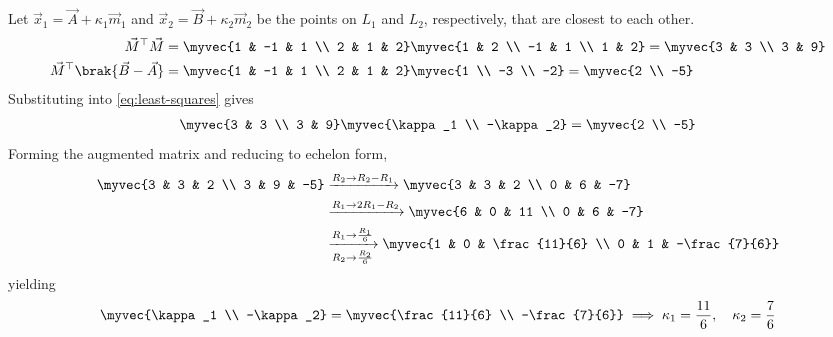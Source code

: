 \begin{enumerate}[label=\thesubsection.\arabic*, ref=\thesubsection.\theenumi]
Let $\vec{x}_1 = \vec{A} + \kappa_1 \vec{m}_1$ and $\vec{x}_2 = \vec{B} + \kappa_2 \vec{m}_2$ be the points on $L_1$ and $L_2$, respectively, that are closest to each other.\\
\begin{align}
	\vec{M}^{\top}\vec{M} &= \myvec{1 & -1 & 1 \\ 2 & 1 & 2}\myvec{1 & 2 \\ -1 & 1 \\ 1 & 2} = \myvec{3 & 3 \\ 3 & 9} \\
	\vec{M}^{\top}\brak{\vec{B} - \vec{A}} &= \myvec{1 & -1 & 1 \\ 2 & 1 & 2}\myvec{1 \\ -3 \\ -2} = \myvec{2 \\ -5}
\end{align}
Substituting into \eqref{eq:least-squares} gives
\begin{align}
	\myvec{3 & 3 \\ 3 & 9}\myvec{\kappa_1 \\ -\kappa_2} = \myvec{2 \\ -5}
\end{align}
Forming the augmented matrix and reducing to echelon form,
\begin{align}
	\myvec{3 & 3 & 2 \\ 3 & 9 & -5}
	&\xrightarrow{R_2 \to R_2 - R_1}
	\myvec{3 & 3 & 2 \\ 0 & 6 & -7} \\
	&\xrightarrow{R_1 \to 2R_1 - R_2}
	\myvec{6 & 0 & 11 \\ 0 & 6 & -7} \\
	&\xrightarrow[R_2 \to \frac{R_2}{6}]{R_1 \to \frac{R_1}{6}}
	\myvec{1 & 0 & \frac{11}{6} \\ 0 & 1 & -\frac{7}{6}}
\end{align}
yielding
\begin{align}
	\myvec{\kappa_1 \\ -\kappa_2} = \myvec{\frac{11}{6} \\ -\frac{7}{6}} \implies \kappa_1 = \frac{11}{6}, \quad \kappa_2 = \frac{7}{6}
\end{align}


\end{enumerate}
